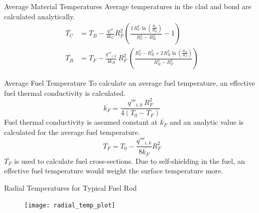 \begin{frame}{Average Material Temperatures}
  Average temperatures in the clad and bond are calculated analytically.
  \begin{align}
    \label{eq:tc_bar}
    \overline{T_C} &= T_B - \frac{q'''}{4 k_C} R_F^2 \left(
      \frac{2 \, R_C^2 \ln\left(\frac{R_C}{R_B}\right)}
      {R_C^2 - R_B^2}  - 1\right) \\
    \label{eq:tb_bar}
    \overline{T_B} &= T_F - \frac{q'''_{i,k}}{4 k_B} \, R_F^2 \, \left(
      \frac{R_F^2 - R_B^2 + 2\,R_B^2 \ln\left(\frac{R_B}{R_F}\right)}
      {R_B^2-R_F^2}\right)
  \end{align}
\end{frame}

\begin{frame}{Average Fuel Temperature}
  To calculate an average fuel temperature, an effective fuel thermal
  conductivity is calculated.
  \begin{equation}
    \label{eq:kfuel_constant}
    \overline{k_F} = \frac{q'''_{i,k} \, R_F^2}{4(T_0-T_F)}
  \end{equation}
  Fuel thermal conductivity is assumed constant at $\overline{k_F}$ and an
  analytic value is calculated for the average fuel temperature.
  \begin{equation}
    \label{eq:tf_bar}
    \overline{T_F} = T_0 - \frac{q'''_{i,k}}{8 \overline{k_F}} R_F^2
  \end{equation}
  $\overline{T_F}$ is used to calculate fuel cross-sections. Due to
  self-shielding in the fuel, an effective fuel temperature would weight the
  surface temperature more.
\end{frame}

\begin{frame}{Radial Temperatures for Typical Fuel Rod}
  \begin{figure}
    \centering
    \texttt{[image: radial\_temp\_plot]}
    \label{fig:radial_temp_plot}
  \end{figure}
\end{frame}

